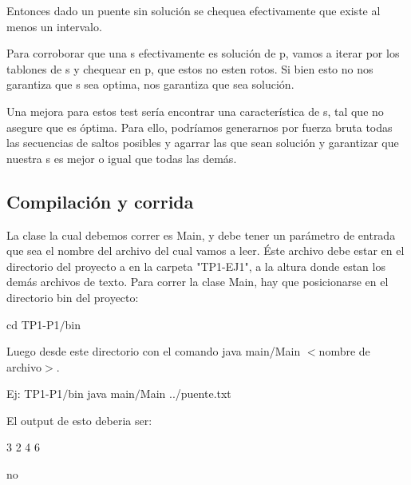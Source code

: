 Entonces dado un puente sin soluci\'on se chequea efectivamente que existe al menos un intervalo.

Para corroborar que una s efectivamente es soluci\'on de p, vamos a iterar por los tablones de s y chequear en p, que estos no esten rotos.
Si bien esto no nos garantiza que s sea optima, nos garantiza que sea soluci\'on.

Una mejora para estos test ser\'ia encontrar una caracter\'istica de s, tal que no asegure que es \'optima. Para ello, podr\'iamos generarnos por fuerza bruta todas las secuencias de saltos posibles y agarrar las que sean soluci\'on y garantizar que nuestra s es mejor o igual que todas las dem\'as.

\subsection{Compilaci\'on y corrida}


La clase la cual debemos correr es Main, y debe tener un par\'ametro de entrada que sea el nombre del archivo del cual vamos a leer. \'Este archivo debe estar en el directorio del proyecto a en la carpeta "TP1-EJ1", a la altura donde estan los dem\'as archivos de texto.
Para correr la clase Main, hay que posicionarse en el directorio bin del proyecto:

cd TP1-P1$/$bin

Luego desde este directorio con el comando java main/Main $<$nombre de archivo$>$.

Ej: TP1-P1$/$bin java main$/$Main ../puente.txt

El output de esto deberia ser: 

3 2 4 6

no

 